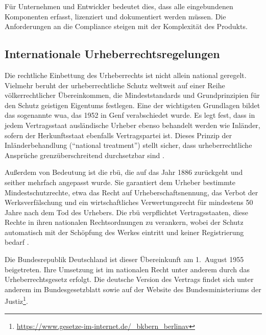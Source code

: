 Für Unternehmen und Entwickler bedeutet dies, dass alle eingebundenen Komponenten erfasst, lizenziert und dokumentiert werden müssen.
Die Anforderungen an die Compliance steigen mit der Komplexität des Produkts.


\subsection{Internationale Urheberrechtsregelungen}

Die rechtliche Einbettung des Urheberrechts ist nicht allein national geregelt.
Vielmehr beruht der urheberrechtliche Schutz weltweit auf einer Reihe völkerrechtlicher Übereinkommen, die Mindeststandards und Grundprinzipien für den Schutz geistigen Eigentums festlegen.
Eine der wichtigsten Grundlagen bildet das sogenannte \gls{wua}, das 1952 in Genf verabschiedet wurde.
Es legt fest, dass in jedem Vertragsstaat ausländische Urheber ebenso behandelt werden wie Inländer, sofern der Herkunftsstaat ebenfalls Vertragspartei ist.
Dieses Prinzip der Inländerbehandlung (\enquote{national treatment}) stellt sicher, dass urheberrechtliche Ansprüche grenzüberschreitend durchsetzbar sind \autocite{meckel_definition_nodate}.

Außerdem von Bedeutung ist die \gls{rbü}, die auf das Jahr 1886 zurückgeht und seither mehrfach angepasst wurde.
Sie garantiert dem Urheber bestimmte Mindestschutzrechte, etwa das Recht auf Urheberschaftsnennung, das Verbot der Werksverfälschung und ein wirtschaftliches Verwertungsrecht für mindestens 50 Jahre nach dem Tod des Urhebers.
Die \gls{rbü} verpflichtet Vertragsstaaten, diese Rechte in ihren nationalen Rechtsordnungen zu verankern, wobei der Schutz automatisch mit der Schöpfung des Werkes eintritt und keiner Registrierung bedarf \autocite{meckel_definition_nodate-1}.

Die Bundesrepublik Deutschland ist dieser Übereinkunft am 1.\ August 1955 beigetreten.
Ihre Umsetzung ist im nationalen Recht unter anderem durch das Urheberrechtsgesetz erfolgt.
Die deutsche Version des Vertrags findet sich unter anderem im Bundesgesetzblatt sowie auf der Website des Bundesministeriums der Justiz\footnote{\url{https://www.gesetze-im-internet.de/\_bkbern\_berlinav}}.

